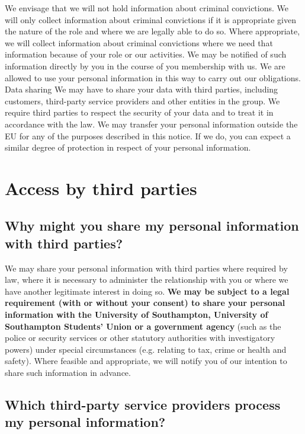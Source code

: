 \documentclass[12pt]{article}
\begin{document}
We envisage that we will not hold information about criminal convictions. 
We will only collect information about criminal convictions if it is appropriate given the nature of the role and where we are legally able to do so. Where appropriate, we will collect information about criminal convictions where we need that information because of your role or our activities.  We may be notified of such information directly by you in the course of you membership with us. 
We are allowed to use your personal information in this way to carry out our obligations.
Data sharing
We may have to share your data with third parties, including customers, third-party service providers and other entities in the group.
We require third parties to respect the security of your data and to treat it in accordance with the law.
We may transfer your personal information outside the EU for any of the purposes described in this notice.
If we do, you can expect a similar degree of protection in respect of your personal information.

\section{Access by third parties}

\subsection{Why might you share my personal information with third parties?}

We may share your personal information with third parties where required by law, where it is necessary to administer the relationship with you or where we have another legitimate interest in doing so. \textbf{We may be subject to a legal requirement (with or without your consent) to share your personal information with the University of Southampton, University of Southampton Students’ Union or a government agency} (such as the police or security services or other statutory authorities with investigatory powers) under special circumstances (e.g. relating to tax, crime or health and safety).  Where feasible and appropriate, we will notify you of our intention to share such information in advance.  

\subsection{Which third-party service providers process my personal information?}
\end{document}
